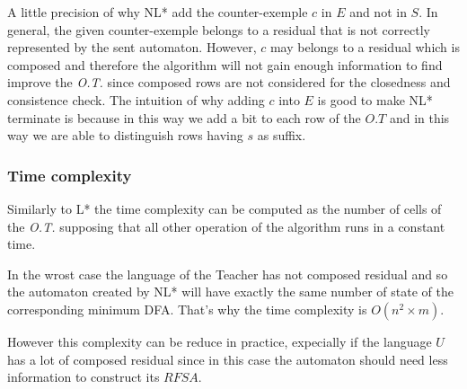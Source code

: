 A little precision of why NL* add the counter-exemple $c$ in $E$ and not in $S$. In general, the given counter-exemple belongs to a residual that is not correctly represented by the sent automaton. However, $c$ may belongs to a residual which is composed and therefore the algorithm will not gain enough information to find improve the \textit{O.T.} since composed rows are not considered for the closedness and consistence check. The intuition of why adding $c$ into $E$ is good to make NL* terminate is because in this way we add a bit to each row of the $O.T$ and in this way we are able to distinguish rows having $s$ as suffix.


\subsubsection{Time complexity}
Similarly to L* the time complexity can be computed as the number of cells of the \textit{O.T.} supposing that all other operation of the algorithm runs in a constant time.

In the wrost case the language of the Teacher has not composed residual and so the automaton created by NL* will have exactly the same number of state of the corresponding minimum DFA. That's why the time complexity is $O(n^2 \times m)$.

However this complexity can be reduce in practice, expecially if the language $U$ has a lot of composed residual since in this case the automaton should need less information to construct its $RFSA$.